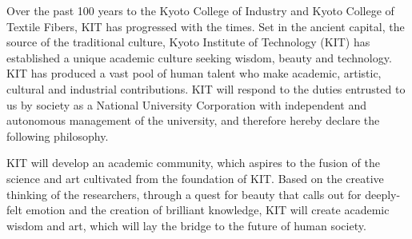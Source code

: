 \documentclass[main]{subfiles}
\begin{document}
\begin{eabstract}
Over the past 100 years to the Kyoto College of Industry and Kyoto
College of Textile Fibers, KIT has progressed with the times. Set 
in the ancient capital, the source of the traditional culture, Kyoto
Institute of Technology (KIT) has established a unique academic 
culture seeking wisdom, beauty and technology. KIT has produced 
a vast pool of human talent who make academic, artistic, cultural 
and industrial contributions. KIT will respond to the duties entrusted 
to us by society as a National University Corporation with independent 
and autonomous management of the university, and therefore hereby 
declare the following philosophy.

KIT will develop an academic community, which aspires to the fusion of 
the science and art cultivated from the foundation of KIT. Based on 
the creative thinking of the researchers, through a quest for beauty 
that calls out for deeply-felt emotion and the creation of brilliant 
knowledge, KIT will create academic wisdom and art, which will lay 
the bridge to the future of human society. 
\end{eabstract}
\end{document}
